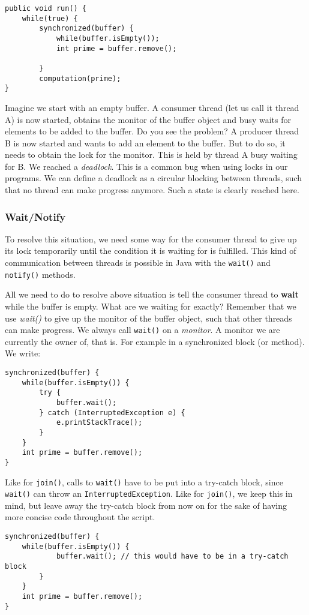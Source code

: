 \documentclass[main.tex]{subfiles}
\begin{document}
\begin{verbatim}
public void run() {
    while(true) {
        synchronized(buffer) {
            while(buffer.isEmpty());
            int prime = buffer.remove();

        }
        computation(prime);
}
\end{verbatim}
Imagine we start with an empty buffer. A consumer thread (let us call it thread A) is now started, obtains the monitor of the buffer object and busy waits for elements to be added to the buffer. Do you see the problem? A producer thread B is now started and wants to add an element to the buffer. But to do so, it needs to obtain the lock for the monitor. This is held by thread A busy waiting for B. We reached a \textit{deadlock}. This is a common bug when using locks in our programs. We can define a deadlock as a circular blocking between threads, such that no thread can make progress anymore. Such a state is clearly reached here.
\subsubsection{Wait/Notify}
To resolve this situation, we need some way for the consumer thread to give up its lock temporarily until the condition it is waiting for is fulfilled. This kind of communication between threads is possible in Java with the \texttt{wait()} and \texttt{notify()} methods.


All we need to do to resolve above situation is tell the consumer thread to \textbf{wait} while the buffer is empty. What are we waiting for exactly? Remember that we use \textit{wait()} to give up the monitor of the buffer object, such that other threads can make progress. We always call \texttt{wait()} on a \textit{monitor}. A monitor we are currently the owner of, that is. For example in a synchronized block (or method). We write:
\begin{verbatim}
synchronized(buffer) {
    while(buffer.isEmpty()) {
        try {
            buffer.wait();
        } catch (InterruptedException e) {
            e.printStackTrace();
        }
    }
    int prime = buffer.remove();
}
\end{verbatim}
Like for \texttt{join()}, calls to \texttt{wait()} have to be put into a try-catch block, since \texttt{wait()} can throw an \texttt{InterruptedException}. Like for \texttt{join()}, we keep this in mind, but leave away the try-catch block from now on for the sake of having more concise code throughout the script.
\begin{verbatim}
synchronized(buffer) {
    while(buffer.isEmpty()) {
            buffer.wait(); // this would have to be in a try-catch block
        }
    }
    int prime = buffer.remove();
}
\end{verbatim}
\end{document}
